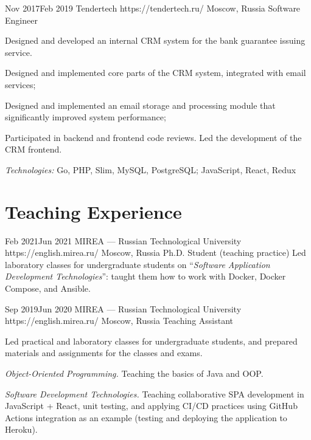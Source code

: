 \documentclass[10pt]{article}
\begin{document}
\job
	{Nov 2017}{Feb 2019}
	{Tendertech}
	{https://tendertech.ru/}
	{Moscow, Russia}
	{Software Engineer}
	{
	  Designed and developed an internal CRM system for the bank guarantee issuing service.

	  \begin{supercompactitemize}
		\item Designed and implemented core parts of the CRM system, integrated with email services;
		\item Designed and implemented an email storage and processing module that significantly improved system performance;
		\item Participated in backend and frontend code reviews. Led the development of the CRM frontend.
	  \end{supercompactitemize}

	  \textit{Technologies:} Go, PHP, Slim, MySQL, PostgreSQL; JavaScript, React, Redux
	}


\newpage


\section{Teaching Experience}

\job
	{Feb 2021}{Jun 2021}
	{MIREA --- Russian Technological University}
	{https://english.mirea.ru/}
	{Moscow, Russia}
	{Ph.D. Student (teaching practice)}
	{
	  Led laboratory classes for undergraduate students on ``\textit{Software Application Development Technologies}'': taught them how to work with Docker, Docker Compose, and Ansible.
	}

\job
	{Sep 2019}{Jun 2020}
	{MIREA --- Russian Technological University}
	{https://english.mirea.ru/}
	{Moscow, Russia}
	{Teaching Assistant}
	{
	  Led practical and laboratory classes for undergraduate students, and prepared materials and assignments for the classes and exams.

	  \begin{supercompactitemize}
	  	\item \textit{Object-Oriented Programming.} Teaching the basics of Java and OOP.
		\item \textit{Software Development Technologies.} Teaching collaborative SPA development in JavaScript + React, unit testing, and applying CI/CD practices using GitHub Actions integration as an example (testing and deploying the application to Heroku).
	  \end{supercompactitemize}
	}
\end{document}

